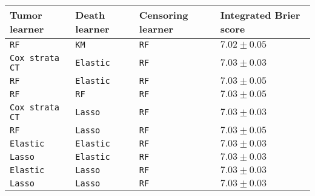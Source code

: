 \begin{tabular}{lll|l}
  \toprule
Tumor learner & Death learner & Censoring learner & Integrated Brier score \\ 
  \midrule
\texttt{RF} & \texttt{KM} & \texttt{RF} & $7.02\pm0.05$ \\ 
  \texttt{Cox strata CT} & \texttt{Elastic} & \texttt{RF} & $7.03\pm0.03$ \\ 
  \texttt{RF} & \texttt{Elastic} & \texttt{RF} & $7.03\pm0.05$ \\ 
  \texttt{RF} & \texttt{RF} & \texttt{RF} & $7.03\pm0.05$ \\ 
  \texttt{Cox strata CT} & \texttt{Lasso} & \texttt{RF} & $7.03\pm0.03$ \\ 
  \texttt{RF} & \texttt{Lasso} & \texttt{RF} & $7.03\pm0.05$ \\ 
  \texttt{Elastic} & \texttt{Elastic} & \texttt{RF} & $7.03\pm0.03$ \\ 
  \texttt{Lasso} & \texttt{Elastic} & \texttt{RF} & $7.03\pm0.03$ \\ 
  \texttt{Elastic} & \texttt{Lasso} & \texttt{RF} & $7.03\pm0.03$ \\ 
  \texttt{Lasso} & \texttt{Lasso} & \texttt{RF} & $7.03\pm0.03$ \\ 
   \bottomrule
\end{tabular}
